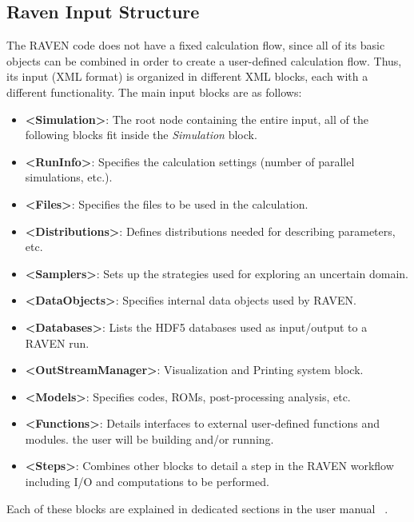 \subsection{Raven Input Structure}
\label{sub:InputStructure}
The RAVEN code does not have a fixed calculation flow, since all of its basic
objects can be combined in order to create a user-defined calculation flow.
%
Thus, its input (XML format) is organized in different XML blocks, each with a
different functionality.
%
The main input blocks are as follows:
\begin{itemize}
  \item \textbf{\textless Simulation\textgreater}: The root node containing the
  entire input, all of
  the following blocks fit inside the \emph{Simulation} block.
  \item \textbf{\textless RunInfo\textgreater}: Specifies the calculation
  settings (number of parallel simulations, etc.).
  \item \textbf{\textless Files\textgreater}: Specifies the files to be
  used in the calculation.
  \item \textbf{\textless Distributions\textgreater}: Defines distributions
  needed for describing parameters, etc.
  \item \textbf{\textless Samplers\textgreater}: Sets up the strategies used for
  exploring an uncertain domain.
  \item \textbf{\textless DataObjects\textgreater}: Specifies internal data objects
  used by RAVEN.
  \item \textbf{\textless Databases\textgreater}: Lists the HDF5 databases used
  as input/output to a
  RAVEN run.
  \item \textbf{\textless OutStreamManager\textgreater}: Visualization and
  Printing system block.
  \item \textbf{\textless Models\textgreater}: Specifies codes, ROMs,
  post-processing analysis, etc.
  \item \textbf{\textless Functions\textgreater}: Details interfaces to external
  user-defined functions and modules.
  the user will be building and/or running.
  \item \textbf{\textless Steps\textgreater}: Combines other blocks to detail a
  step in the RAVEN workflow including I/O and computations to be performed.
\end{itemize}

Each of these blocks are explained in dedicated sections in the user manual ~\cite{RAVENuserManual}.
%
